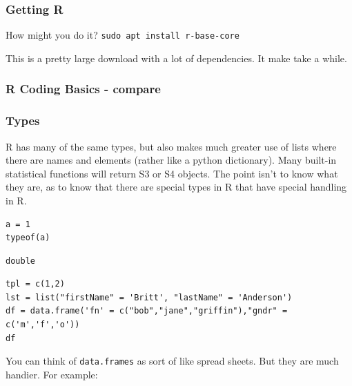 \documentclass{article}
\begin{document}
\subsubsection{Getting R}
\label{sec:org45c8f91}
How might you do it?
\texttt{sudo apt install r-base-core}

This is a pretty large download with a lot of dependencies. It make take a while. 
\subsubsection{R Coding Basics - compare}
\label{sec:orge3800bd}
\subsubsection{Types}
\label{sec:org8db4937}
R has many of the same types, but also makes much greater use of lists where there are names and elements (rather like a python dictionary). Many built-in statistical functions will return S3 or S4 objects. The point isn't to know what they are, as to know that there are special types in R that have special handling in R.

\begin{verbatim}
a = 1
typeof(a)
\end{verbatim}

\begin{verbatim}
double
\end{verbatim}


\begin{verbatim}
tpl = c(1,2)
lst = list("firstName" = 'Britt', "lastName" = 'Anderson')
df = data.frame('fn' = c("bob","jane","griffin"),"gndr" = c('m','f','o'))
df
\end{verbatim}


You can think of \texttt{data.frames} as sort of like spread sheets. But they are much handier. For example:
\end{document}

